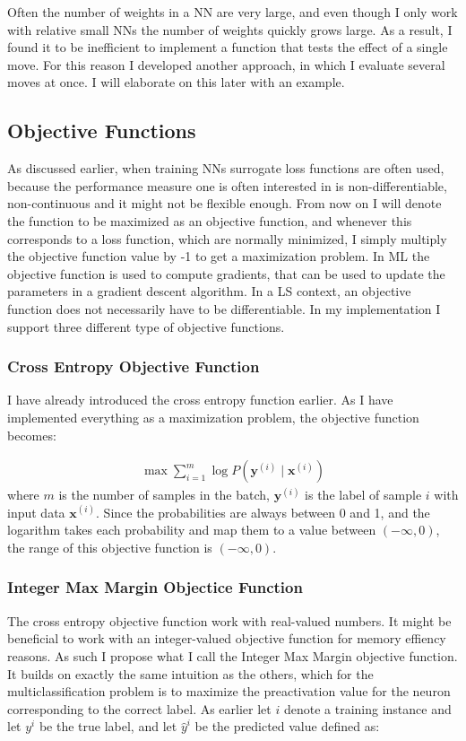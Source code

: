 Often the number of weights in a NN are very large, and even though I only work with relative small NNs the number of weights quickly grows large. As a result, I found it to be inefficient to implement a function that tests the effect of a single move. For this reason I developed another approach, in which I evaluate several moves at once. I will elaborate on this later with an example. 

\subsection{Objective Functions}
As discussed earlier, when training NNs surrogate loss functions are often used, because the performance measure one is often interested in is non-differentiable, non-continuous and it might not be flexible enough. From now on I will denote the function to be maximized as an objective function, and whenever this corresponds to a loss function, which are normally minimized, I simply multiply the objective function value by -1 to get a maximization problem. In ML the objective function is used to compute gradients, that can be used to update the parameters in a gradient descent algorithm. In a LS context, an objective function does not necessarily have to be differentiable. In my implementation I support three different type of objective functions.

\subsubsection{Cross Entropy Objective Function}
I have already introduced the cross entropy function earlier. As I have implemented everything as a maximization problem, the objective function becomes:

\begin{align}
    \label{cs} \max \sum_{i=1}^m \log P(\mathbf{y}^{(i)} \mid \mathbf{x}^{(i)})
\end{align}
where $m$ is the number of samples in the batch, $\mathbf{y}^{(i)}$ is the label of sample $i$ with input data $\mathbf{x}^{(i)}$. Since the probabilities are always between 0 and 1, and the logarithm takes each probability and map them to a value between $(-\infty, 0)$, the range of this objective function is $(-\infty, 0)$. 

\subsubsection{Integer Max Margin Objectice Function}
The cross entropy objective function work with real-valued numbers. It might be beneficial to work with an integer-valued objective function for memory effiency reasons. As such I propose what I call the Integer Max Margin objective function. It builds on exactly the same intuition as the others, which for the multiclassification problem is to maximize the preactivation value for the neuron corresponding to the correct label. As earlier let $i$ denote a training instance and let $y^i$ be the true label, and let $\hat{y}^i$ be the predicted value defined as:

